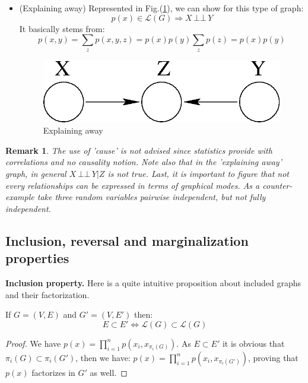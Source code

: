 \documentclass[12pt]{report}
\newcommand{\indep}{\ensuremath{\,\bot\!\!\!\bot\,}} %
\newtheorem{remark}{Remark}[section]
\begin{document}
\begin{itemize}
	\item (Explaining away) Represented in Fig.(\ref{fig3}), we can show for this type of graph:
	\begin{equation}
	 p(x) \in\mathcal{L}(G) \Rightarrow X\indep Y
	\label{eq:}
	\end{equation}
	It basically stems from:
	\begin{equation*}
		p(x,y) = \sum_z p(x,y,z) = p(x)p(y) \sum_z p(z) = p(x) p(y)
	\end{equation*}
	\begin{figure}[h!]
	\centering
	\includegraphics[scale=.75]{fig3.eps}
	\caption{Explaining away}
	\label{fig3}
	\end{figure}
\end{itemize}


\begin{remark}
The use of 'cause' is not advised since statistics provide with correlations and no causality notion. Note also that in the 'explaining away' graph, in general $X\indep Y | Z$ is not true. Last, it is important to figure that not every relationships can be expressed in terms of graphical modes. As a counter-example take three random variables pairwise independent, but not fully independent. 
\end{remark}


\subsection{Inclusion, reversal and marginalization properties}

\hspace{.5cm}\textbf{Inclusion property. }Here is a quite intuitive proposition about included graphs and their factorization.
\begin{proposition}
If $G = (V,E)$ and $G' = (V,E')$ then: 
\begin{equation}
E \subset E' \Leftrightarrow \mathcal{L}(G) \subset \mathcal{L}(G)
\label{eq:}
\end{equation}
\end{proposition}
\begin{proof}
We have $p(x) = \prod_{i=1}^n p(x_i, x_{\pi_i(G)})$. As $E \subset E'$ it is obvious that $\pi_i(G) \subset \pi_i(G')$, then we have: $p(x) = \prod_{i=1}^n p(x_i, x_{\pi_i(G')})$, proving that $p(x)$ factorizes in $G'$ as well.
\end{proof}
\end{document}
